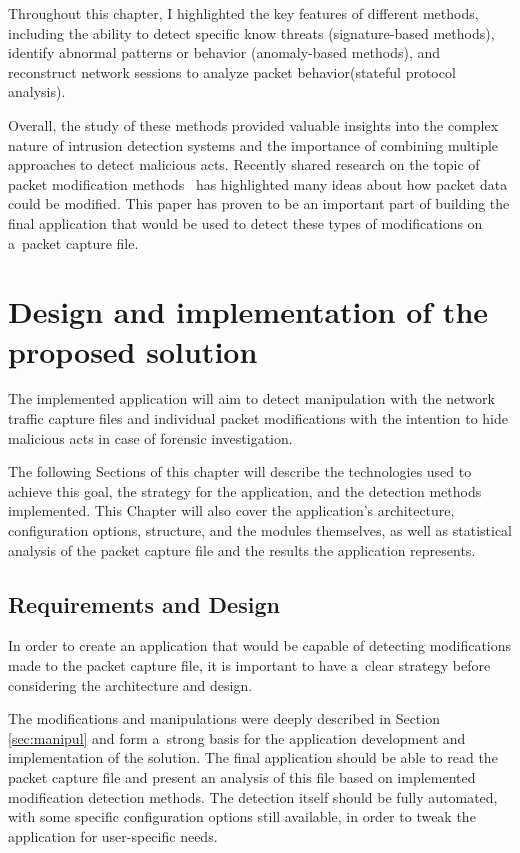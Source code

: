 \documentclass[
  printed,     %
  color,       %
  oneside,     %
  nosansbold,  %
  nocolorbold, %
  nolof,         %
  nolot,         %
]{fithesis4}
\begin{document}
Throughout this chapter, I highlighted the key features of different methods, including the ability to detect specific know threats (signature-based methods), identify abnormal patterns or behavior (anomaly-based methods), and reconstruct network sessions to analyze packet behavior(stateful protocol analysis).

Overall, the study of these methods provided valuable insights into the complex nature of intrusion detection systems and the importance of combining multiple approaches to detect malicious acts. Recently shared research on the topic of packet modification methods~\cite{Howcanne5:online} has highlighted many ideas about how packet data could be modified. This paper has proven to be an important part of building the final application that would be used to detect these types of modifications on a~packet capture file.

\newpage
\chapter{Design and implementation of the proposed solution}
\label{chap:desimp}

The implemented application will aim to detect manipulation with the network traffic capture files and individual packet modifications with the intention to hide malicious acts in case of forensic investigation. 

The following Sections of this chapter will describe the technologies used to achieve this goal, the strategy for the application, and the detection methods implemented. This Chapter will also cover the application's architecture, configuration options, structure, and the modules themselves, as well as statistical analysis of the packet capture file and the results the application represents.

\section{Requirements and Design}

In order to create an application that would be capable of detecting modifications made to the packet capture file, it is important to have a~clear strategy before considering the architecture and design. 

The modifications and manipulations were deeply described in Section \ref{sec:manipul} and form a~strong basis for the application development and implementation of the solution. The final application should be able to read the packet capture file and present an analysis of this file based on implemented modification detection methods. The detection itself should be fully automated, with some specific configuration options still available, in order to tweak the application for user-specific needs.
\end{document}
